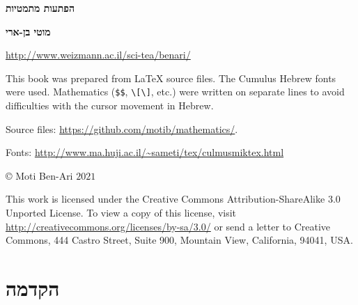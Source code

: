 
\thispagestyle{empty}

\begin{center}
\textbf{\Huge הפתעות מתמטיות}
 
\bigskip
\bigskip
\bigskip
\bigskip

\textbf{\Large מוטי בן-ארי}

\bigskip
\bigskip

\url{http://www.weizmann.ac.il/sci-tea/benari/}
\end{center}




\newpage
\thispagestyle{empty}

This book was prepared from \LaTeX{} source files.  The Cumulus Hebrew fonts were used. Mathematics (\verb+$$+, \verb+\[\]+, etc.) were written on separate lines to avoid difficulties with the cursor movement in Hebrew.

Source files: \url{https://github.com/motib/mathematics/}.

Fonts:
\url{http://www.ma.huji.ac.il/~sameti/tex/culmusmiktex.html}

\vfill

\begin{center}
\copyright{} Moti Ben-Ari $2021$ 
\end{center}

\begin{footnotesize}
This work is licensed under the Creative Commons Attribution-ShareAlike 3.0 Unported License. To view a copy of this license, visit \url{http://creativecommons.org/licenses/by-sa/3.0/} or send a letter to Creative Commons, 444 Castro Street, Suite 900, Mountain View, California, 94041, USA.
\end{footnotesize}

%

\newpage


\tableofcontents
\thispagestyle{empty}



\chapter{הקדמה}

